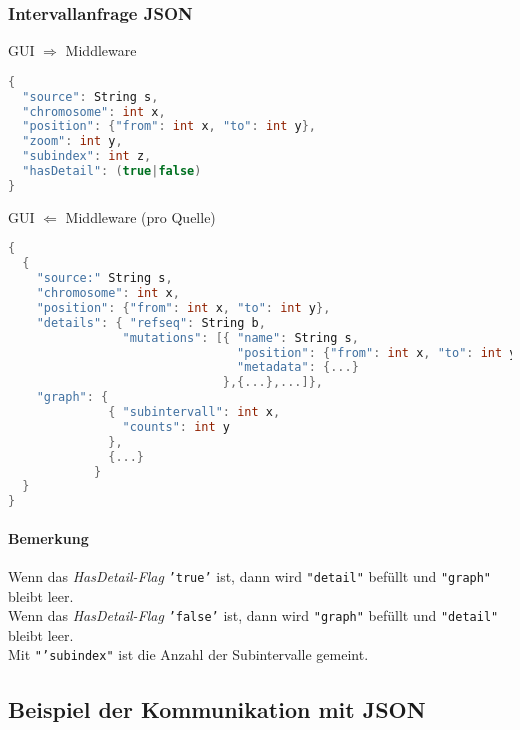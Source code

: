 \subsubsection{Intervallanfrage JSON}
GUI $\Rightarrow$ Middleware
\begin{lstlisting}[language=c,
commentstyle=\fontsize{12}{14.4}\selectfont,
basicstyle=\ttfamily\fontsize{10}{12}\selectfont, showstringspaces=false]
{
  "source": String s,
  "chromosome": int x,
  "position": {"from": int x, "to": int y},
  "zoom": int y,
  "subindex": int z,
  "hasDetail": (true|false)
}
\end{lstlisting}
GUI $\Leftarrow$ Middleware (pro Quelle)
\begin{lstlisting}[language=c,
commentstyle=\fontsize{12}{14.4}\selectfont,
basicstyle=\ttfamily\fontsize{10}{12}\selectfont, showstringspaces=false]
{
  {
    "source:" String s,
    "chromosome": int x,
    "position": {"from": int x, "to": int y},
    "details": { "refseq": String b,
                "mutations": [{ "name": String s,
                                "position": {"from": int x, "to": int y},
                                "metadata": {...}
                              },{...},...]},
    "graph": {
              { "subintervall": int x,
                "counts": int y
              },
              {...}
            }
  }
}
\end{lstlisting}
\paragraph{Bemerkung} Wenn das \textit{HasDetail-Flag} \texttt{'true'} ist, dann wird \texttt{"detail"} befüllt und \texttt{"graph"} bleibt leer.\\
Wenn das \textit{HasDetail-Flag} \texttt{'false'} ist, dann wird \texttt{"graph"} befüllt und \texttt{"detail"} bleibt leer.\\
Mit \texttt{"'subindex"} ist die Anzahl der Subintervalle gemeint.
\newpage
\subsection{Beispiel der Kommunikation mit JSON}

